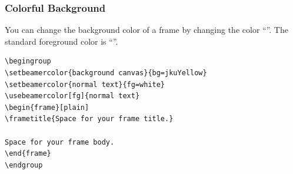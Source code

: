 \documentclass[utf8,aspectratio=169,ngerman,english]{beamer}
\begin{document}
\begingroup
{}
\begin{frame}[containsverbatim]
\frametitle{Colorful Background}

You can change the background color of a frame by changing the color ``''. The standard foreground color is ``''.

\color{black}
\begin{lstlisting}[language={[LaTeX]TeX},numbers=none]
\begingroup
\setbeamercolor{background canvas}{bg=jkuYellow}
\setbeamercolor{normal text}{fg=white}
\usebeamercolor[fg]{normal text}
\begin{frame}[plain]
\frametitle{Space for your frame title.}

Space for your frame body.
\end{frame}
\endgroup
\end{lstlisting}
\end{frame}
\endgroup
\end{document}

